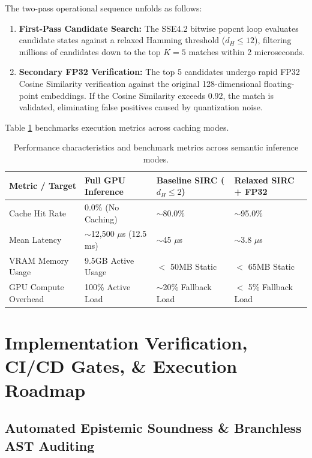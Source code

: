The two-pass operational sequence unfolds as follows:
\begin{enumerate}
    \item \textbf{First-Pass Candidate Search:} The SSE4.2 bitwise popcnt loop evaluates candidate states against a relaxed Hamming threshold ($d_H \le 12$), filtering millions of candidates down to the top $K=5$ matches within 2 microseconds.
    \item \textbf{Secondary FP32 Verification:} The top 5 candidates undergo rapid FP32 Cosine Similarity verification against the original 128-dimensional floating-point embeddings. If the Cosine Similarity exceeds 0.92, the match is validated, eliminating false positives caused by quantization noise.
\end{enumerate}

Table \ref{tab:sirc_performance_comparison} benchmarks execution metrics across caching modes.

\begin{table}[htbp]
\centering
\small
\begin{tabularx}{\textwidth}{l p{2.8cm} p{2.8cm} X}
\toprule
\textbf{Metric / Target} & \textbf{Full GPU Inference} & \textbf{Baseline SIRC ($d_H \le 2$)} & \textbf{Relaxed SIRC + FP32} \\
\midrule
Cache Hit Rate & 0.0\% (No Caching) & $\sim$80.0\% & $\sim$95.0\% \\
Mean Latency & $\sim$12,500 $\mu$s (12.5 ms) & $\sim$45 $\mu$s & $\sim$3.8 $\mu$s \\
VRAM Memory Usage & 9.5GB Active Usage & $<$ 50MB Static & $<$ 65MB Static \\
GPU Compute Overhead & 100\% Active Load & $\sim$20\% Fallback Load & $<$ 5\% Fallback Load \\
\bottomrule
\end{tabularx}
\caption{Performance characteristics and benchmark metrics across semantic inference modes.}
\label{tab:sirc_performance_comparison}
\end{table}

\section{Implementation Verification, CI/CD Gates, \& Execution Roadmap}

\subsection{Automated Epistemic Soundness \& Branchless AST Auditing}

